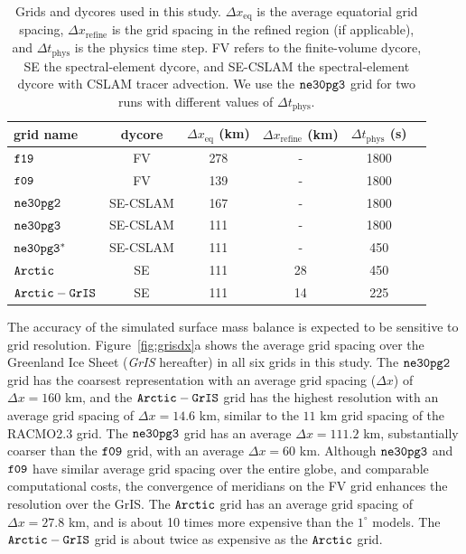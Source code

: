 \documentclass[draft]{agujournal2019}
\begin{document}
 \begin{table}
 \centering
 \scriptsize
 \begin{tabular}{lccccc}
   \hline
   grid name & dycore & $\Delta x_{\mathrm{eq}}$ (km) & $\Delta x_{\mathrm{refine}}$ (km) & $\Delta t_{\mathrm{phys}}$ (s) \\ 
   \hline
   $\tt f19$ & FV & 278 & - &1800 \\
   $\tt f09$ & FV & 139 & - &1800 \\
   $\tt ne30pg2$ & SE-CSLAM & 167 & - & 1800 \\
   $\tt ne30pg3$ & SE-CSLAM & 111 & - & 1800 \\
   $\tt ne30pg3^{*}$ & SE-CSLAM & 111 & - & 450 \\
   $\tt Arctic$ & SE & 111 & 28 & 450 \\
   $\tt Arctic-GrIS$ & SE & 111 & 14 & 225 \\
 \hline
 \end{tabular}
  \caption{Grids and dycores used in this study. $\Delta x_{\mathrm{eq}}$ is the average equatorial grid spacing, $\Delta x_{\mathrm{refine}}$ is the grid spacing in the refined region (if applicable), and $\Delta t_{\mathrm{phys}}$ is the physics time step. FV refers to the finite-volume dycore, SE the spectral-element dycore, and SE-CSLAM the spectral-element dycore with CSLAM tracer advection.  We use the $\tt ne30pg3$ grid for two runs with different values of $\Delta t_{\mathrm{phys}}$.}
 \label{tbl:table1}
 \end{table}

The accuracy of the simulated surface mass balance is expected to be sensitive to grid resolution. Figure~\ref{fig:grisdx}a shows the average grid spacing over the Greenland Ice Sheet (\textit{GrIS} hereafter) in all six grids in this study. The $\tt ne30pg2$ grid has the coarsest representation with an average grid spacing ($\Delta x$) of $\Delta x=160$ km, and the $\tt Arctic-GrIS$ grid has the highest resolution with an average grid spacing of $\Delta x=14.6$ km, similar to the $11$ km grid spacing of the RACMO2.3 grid. The $\tt ne30pg3$ grid has an average $\Delta x=111.2$ km, substantially coarser than the $\tt f09$ grid, with an average $\Delta x=60$ km. Although $\tt ne30pg3$ and $\tt f09$ have similar average grid spacing over the entire globe, and comparable computational costs, the convergence of meridians on the FV grid enhances the resolution over the GrIS. The $\tt Arctic$ grid has an average grid spacing of $\Delta x=27.8$ km, and is about 10 times more expensive than the $1^{\circ}$ models.  The $\tt Arctic-GrIS$ grid is about twice as expensive as the $\tt Arctic$ grid.
\end{document}
